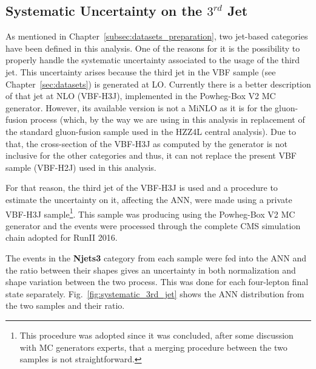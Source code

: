 
\subsection{Systematic Uncertainty on the $3^{rd}$ Jet}
As mentioned in Chapter~\ref{subsec:datasets_preparation}, two jet-based categories have been defined in this analysis. One of the reasons for it is the possibility to properly handle the systematic uncertainty associated to the usage of the third jet. This uncertainty arises because the third jet in the VBF sample (see Chapter~\ref{sec:datasets}) is generated at LO. Currently there is a better description of that jet at NLO (VBF-H3J), implemented in the Powheg-Box V2 MC generator. However, its available version is not a MiNLO as it is for the gluon-fusion process (which, by the way we are using in this analysis in replacement of the standard gluon-fusion sample used in the HZZ4L central analysis). Due to that, the cross-section of the VBF-H3J as computed by the generator is not inclusive for the other categories and thus, it can not replace the present VBF sample (VBF-H2J) used in this analysis.

For that reason, the third jet of the VBF-H3J is used and a procedure to estimate the uncertainty on it, affecting the ANN, were made using a private VBF-H3J sample\footnote{This procedure was adopted since it was concluded, after some discussion with MC generators experts, that a merging procedure between the two samples is not straightforward.}. This sample was producing using the Powheg-Box V2 MC generator and the events were processed through the complete CMS simulation chain adopted for RunII 2016.

The events in the \textbf{Njets3} category from each sample were fed into the ANN and the ratio between their shapes gives an uncertainty in both normalization and shape variation between the two process. This was done for each four-lepton final state separately. Fig.~\ref{fig:systematic_3rd_jet} shows the ANN distribution from the two samples and their ratio.

